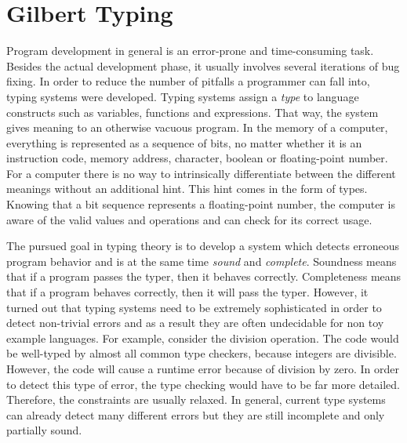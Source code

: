 \chapter{Gilbert Typing}
\label{cha:gilberttyping}

Program development in general is an error-prone and time-consuming task.
Besides the actual development phase, it usually involves several iterations of bug fixing.
In order to reduce the number of pitfalls a programmer can fall into, typing systems were developed.
Typing systems assign a \emph{type} to language constructs such as variables, functions and expressions.
That way, the system gives meaning to an otherwise vacuous program.
In the memory of a computer, everything is represented as a sequence of bits, no matter whether it is an instruction code, memory address, character, boolean or floating-point number.
For a computer there is no way to intrinsically differentiate between the different meanings without an additional hint.
This hint comes in the form of types.
Knowing that a bit sequence represents a floating-point number, the computer is aware of the valid values and operations and can check for its correct usage.

The pursued goal in typing theory is to develop a system which detects erroneous program behavior and is at the same time \emph{sound} and \emph{complete}.
Soundness means that if a program passes the typer, then it behaves correctly.
Completeness means that if a program behaves correctly, then it will pass the typer.
However, it turned out that typing systems need to be extremely sophisticated in order to detect non-trivial errors and as a result they are often undecidable for non toy example languages.
For example, consider the division operation.
The code  would be well-typed by almost all common type checkers, because integers are divisible.
However, the code will cause a runtime error because of division by zero.
In order to detect this type of error, the type checking would have to be far more detailed.
Therefore, the constraints are usually relaxed.
In general, current type systems can already detect many different errors but they are still incomplete and only partially sound.

